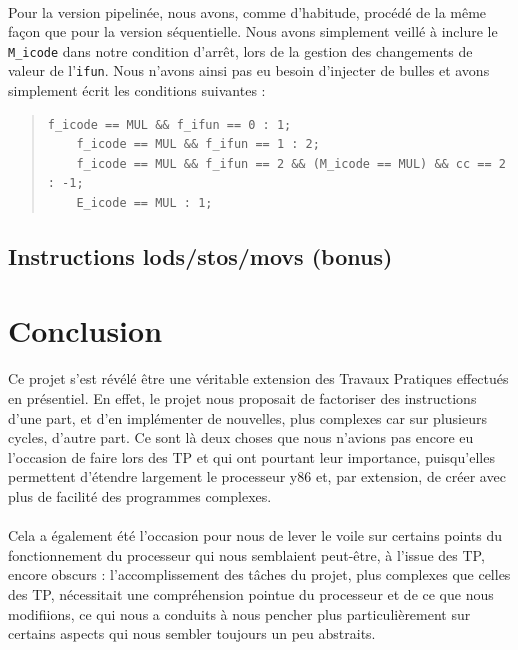 \documentclass[12pt]{article}
\begin{document}
\paragraph{}Pour la version pipelinée, nous avons, comme d'habitude, procédé de la même façon que pour la version séquentielle. Nous avons simplement veillé à inclure le \verb+M_icode+ dans notre condition d'arrêt, lors de la gestion des changements de valeur de l'\verb+ifun+. Nous n'avons ainsi pas eu besoin d'injecter de bulles et avons simplement écrit les conditions suivantes :
\begin{quote}
  \begin{verbatim}
f_icode == MUL && f_ifun == 0 : 1;
	f_icode == MUL && f_ifun == 1 : 2;
	f_icode == MUL && f_ifun == 2 && (M_icode == MUL) && cc == 2 : -1;
	E_icode == MUL : 1;
\end{verbatim}
\end{quote}


\subsection{Instructions lods/stos/movs (bonus)}




\section*{Conclusion}
\paragraph{}Ce projet s'est révélé être une véritable extension des Travaux Pratiques effectués en présentiel. En effet, le projet nous proposait de factoriser des instructions d'une part, et d'en implémenter de nouvelles, plus complexes car sur plusieurs cycles, d'autre part. Ce sont là deux choses que nous n'avions pas encore eu l'occasion de faire lors des TP et qui ont pourtant leur importance, puisqu'elles permettent d'étendre largement le processeur y86 et, par extension, de créer avec plus de facilité des programmes complexes.

\paragraph{}Cela a également été l'occasion pour nous de lever le voile sur certains points du fonctionnement du processeur qui nous semblaient peut-être, à l'issue des TP, encore obscurs : l'accomplissement des tâches du projet, plus complexes que celles des TP, nécessitait une compréhension pointue du processeur et de ce que nous modifiions, ce qui nous a conduits à nous pencher plus particulièrement sur certains aspects qui nous sembler toujours un peu abstraits.
\end{document}
